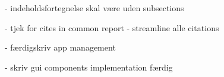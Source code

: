 - indeholdsfortegnelse skal være uden subsections

- tjek for cites in common report - streamline alle citations

- færdigskriv app management

- skriv gui components implementation færdig